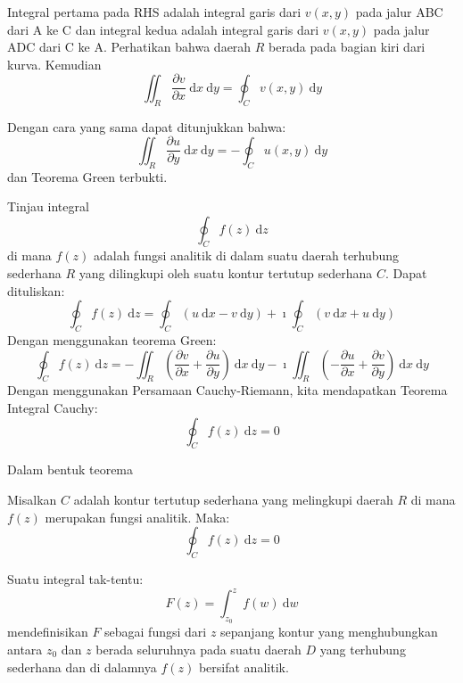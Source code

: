 Integral pertama pada RHS adalah integral garis dari $v(x,y)$ pada
jalur ABC dari A ke C dan integral kedua adalah integral garis dari
$v(x,y)$ pada jalur ADC dari C ke A. Perhatikan bahwa daerah $R$
berada pada bagian kiri dari kurva. Kemudian
\begin{equation*}
\iint_{R}\frac{\partial v}{\partial x}\ \mathrm{d}x\ \mathrm{d}y=\oint_{C}v(x,y)\ \mathrm{d}y
\end{equation*}

Dengan cara yang sama dapat ditunjukkan bahwa:
\begin{equation*}
\iint_{R}\frac{\partial u}{\partial y}\ \mathrm{d}x\ \mathrm{d}y=-\oint_{C}u(x,y)\ \mathrm{d}y    
\end{equation*}
dan Teorema Green terbukti.




Tinjau integral
\begin{equation*}
\oint_{C}f(z)\ \mathrm{d}z
\end{equation*}
di mana $f(z)$ adalah fungsi analitik di dalam suatu daerah terhubung
sederhana $R$ yang dilingkupi oleh suatu kontur tertutup sederhana
$C$. Dapat dituliskan:
\begin{equation*}
\oint_{C}f(z)\ \mathrm{d}z =
\oint_{C} \left( u\ \mathrm{d}x-v\ \mathrm{d}y \right) +
\imath \oint_{C} \left( v\ \mathrm{d}x + u\ \mathrm{d}y \right)
\end{equation*}
Dengan menggunakan teorema Green:
\begin{equation*}
\oint_{C}f(z)\ \mathrm{d}z = -\iint_{R} \left(\frac{\partial v}{\partial x} +
\frac{\partial u}{\partial y}\right)\ \mathrm{d}x\ \mathrm{d}y -
\imath\iint_{R}\left(-\frac{\partial u}{\partial x} +
\frac{\partial v}{\partial y}\right)\ \mathrm{d}x\ \mathrm{d}y
\end{equation*}
Dengan menggunakan Persamaan Cauchy-Riemann, kita mendapatkan Teorema
Integral Cauchy:
\begin{equation*}
\oint_{C} f(z)\ \mathrm{d}z = 0
\end{equation*}

Dalam bentuk teorema

Misalkan $C$ adalah kontur tertutup sederhana yang melingkupi daerah
$R$ di mana $f(z)$ merupakan fungsi analitik. Maka:
\begin{equation*}
\oint_{C}f(z)\ \mathrm{d}z = 0
\end{equation*}

Suatu integral tak-tentu:
\begin{equation*}
F(z)=\int_{z_{0}}^{z}f(w)\ \mathrm{d}w
\end{equation*}
mendefinisikan $F$ sebagai fungsi dari $z$ sepanjang kontur yang
menghubungkan antara $z_{0}$ dan $z$ berada seluruhnya pada suatu
daerah $D$ yang terhubung sederhana dan di dalamnya $f(z)$ bersifat
analitik.

